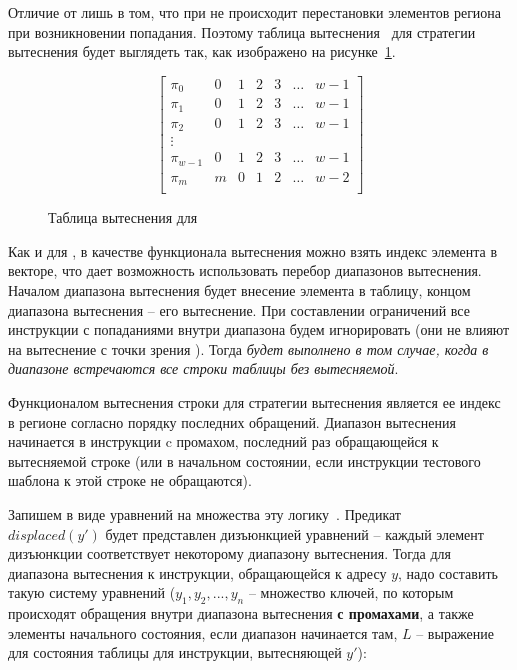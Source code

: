 Отличие от \LRU лишь в том, что при \FIFO не происходит перестановки
элементов региона при возникновении попадания. Поэтому таблица
вытеснения~\cite{policy_tables} для стратегии вытеснения \FIFO будет
выглядеть так, как изображено на рисунке~\ref{fifo_policy_table}.

\begin{figure}
$$
  \left[
    \begin{array}{c|cccccc}
      \pi_0 & 0 & 1 & 2 & 3 & \dots & w-1 \\
      \pi_1 & 0 & 1 & 2 & 3 & \dots & w-1 \\
      \pi_2 & 0 & 1 & 2 & 3 & \dots & w-1 \\
      \vdots &  &  &  & & & \\
      \pi_{w-1} & 0 & 1 & 2 & 3 & \dots & w-1 \\
      \pi_m & m & 0 & 1 & 2 & \dots & w-2 \\
    \end{array}
  \right]
$$
\caption{Таблица вытеснения для \FIFO}\label{fifo_policy_table}
\end{figure}

Как и для \LRU, в качестве функционала вытеснения можно взять индекс элемента в векторе, что дает возможность использовать перебор диапазонов вытеснения. Началом диапазона вытеснения будет внесение элемента в таблицу, концом диапазона вытеснения -- его вытеснение. При составлении ограничений все инструкции с попаданиями внутри диапазона будем игнорировать (они не влияют на вытеснение с точки
зрения \FIFO). Тогда \emph{\FIFO будет выполнено в том случае, когда в диапазоне встречаются все строки таблицы без вытесняемой}.

\begin{utv}
Функционалом вытеснения строки для стратегии вытеснения \FIFO является ее индекс в регионе согласно порядку последних обращений. Диапазон вытеснения начинается в инструкции c промахом, последний раз
обращающейся к вытесняемой строке (или в начальном состоянии, если инструкции тестового шаблона к этой строке не обращаются).
\end{utv}

Запишем в виде уравнений на множества эту логику~\cite{my_nivc_2009}. Предикат\\
$displaced(y')$ будет представлен дизъюнкцией уравнений -- каждый
элемент дизъюнкции соответствует некоторому диапазону вытеснения.
Тогда для диапазона вытеснения к инструкции, обращающейся к адресу $y$, надо составить такую систему уравнений ($y_1, y_2, ..., y_n$ -- множество ключей, по которым происходят обращения внутри диапазона вытеснения \textbf{с промахами}, а также элементы начального состояния, если диапазон начинается там, $L$ -- выражение для состояния таблицы для инструкции, вытесняющей $y'$):
\begin{theorem}\label{FIFO_equation} \DiapazonFIFO
\end{theorem}

